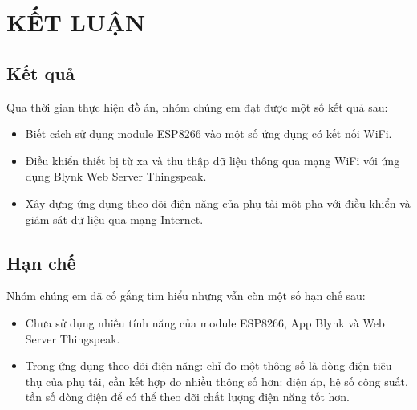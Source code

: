 \chapter{KẾT LUẬN}

\section{Kết quả}
    Qua thời gian thực hiện đồ án, nhóm chúng em đạt được một số kết quả sau:
        \begin{itemize}
            \item Biết cách sử dụng module ESP8266 vào một số ứng dụng có kết nối WiFi.
            \item Điều khiển thiết bị từ xa và thu thập dữ liệu thông qua mạng WiFi với ứng dụng Blynk Web Server Thingspeak.
            \item Xây dựng ứng dụng theo dõi điện năng của phụ tải một pha với điều khiển và giám sát dữ liệu qua mạng Internet.
        \end{itemize}

\section{Hạn chế}
    Nhóm chúng em đã cố gắng tìm hiểu nhưng vẫn còn một số hạn chế sau:
        \begin{itemize}
            \item Chưa sử dụng nhiều tính năng của module ESP8266, App Blynk và Web Server Thingspeak.
            \item Trong ứng dụng theo dõi điện năng: chỉ đo một thông số là dòng điện tiêu thụ của phụ tải, cần kết hợp đo nhiều thông số hơn: điện áp, hệ số công suất, tần số dòng điện để có thể theo dõi chất lượng điện năng tốt hơn.
        \end{itemize}
